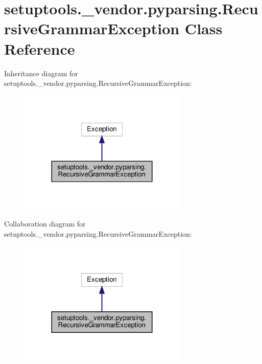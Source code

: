 \hypertarget{classsetuptools_1_1__vendor_1_1pyparsing_1_1RecursiveGrammarException}{}\section{setuptools.\+\_\+vendor.\+pyparsing.\+Recursive\+Grammar\+Exception Class Reference}
\label{classsetuptools_1_1__vendor_1_1pyparsing_1_1RecursiveGrammarException}


Inheritance diagram for setuptools.\+\_\+vendor.\+pyparsing.\+Recursive\+Grammar\+Exception\+:
\nopagebreak
\begin{figure}[H]
\begin{center}
\leavevmode
\includegraphics[width=227pt]{classsetuptools_1_1__vendor_1_1pyparsing_1_1RecursiveGrammarException__inherit__graph}
\end{center}
\end{figure}


Collaboration diagram for setuptools.\+\_\+vendor.\+pyparsing.\+Recursive\+Grammar\+Exception\+:
\nopagebreak
\begin{figure}[H]
\begin{center}
\leavevmode
\includegraphics[width=227pt]{classsetuptools_1_1__vendor_1_1pyparsing_1_1RecursiveGrammarException__coll__graph}
\end{center}
\end{figure}
